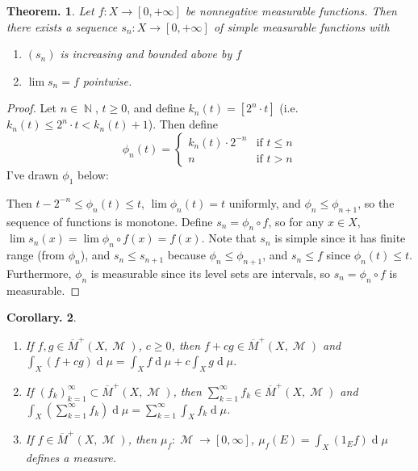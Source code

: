 \documentclass[11pt, a4paper]{memoir}
\DeclareMathOperator{\N}{{\mathbb{N}}}
\newcommand{\ol}[1]{\ensuremath{\overline{#1}}}
\theoremstyle{change}
\newtheorem{theorem}{Theorem.}[section]
\newtheorem{corollary}[theorem]{Corollary.}
\theoremstyle{plain}
\theoremstyle{nonumberplain}
\newtheorem{proof}{Proof}
\DeclareMathOperator{\M}{{\mathcal{M}}}
\renewcommand{\d}[1]{\ensuremath{\operatorname{d}\!{#1}}}
\numberwithin{equation}{section}
\begin{document}
\begin{theorem}
    Let $f:X\to[0,+\infty]$ be nonnegative measurable functions.
    Then there exists a sequence $s_n:X\to[0,+\infty]$ of simple measurable functions with
    \begin{enumerate}[nolistsep]
        \item $(s_n)$ is increasing and bounded above by $f$
        \item $\lim s_n=f$ pointwise.
    \end{enumerate}
\end{theorem}
\begin{proof}
    Let $n\in\N$, $t\geq0$, and define $k_n(t)=[2^{n}\cdot t]$ (i.e. $k_n(t)\leq 2^{n}\cdot t<k_n(t)+1$).
    Then define
    \[\phi_n(t)=\begin{cases}k_n(t)\cdot 2^{-n}&\text{if }t\leq n\\n&\text{if }t>n\end{cases}\]
    I've drawn $\phi_1$ below:
    \begin{center}
    \end{center}
    Then $t-2^{-n}\leq\phi_n(t)\leq t$, $\lim\phi_n(t)=t$ uniformly, and $\phi_n\leq \phi_{n+1}$, so the sequence of functions is monotone.
    Define $s_n=\phi_n\circ f$, so for any $x\in X$, $\lim s_n(x)=\lim \phi_n\circ f(x)=f(x)$.
    Note that $s_n$ is simple since it has finite range (from $\phi_n$), and $s_n\leq s_{n+1}$ because $\phi_n\leq \phi_{n+1}$, and $s_n\leq f$ since $\phi_n(t)\leq t$.
    Furthermore, $\phi_n$ is measurable since its level sets are intervals, so $s_n=\phi_n\circ f$ is measurable.
\end{proof}
\begin{corollary}
    \begin{enumerate}
        \item If $f,g\in\ol{M}^+(X,\M)$, $c\geq 0$, then $f+cg\in\ol{M}^+(X,\M)$ and $\int_X(f+cg)\d{\mu}=\int_X f\d{\mu}+c\int_Xg\d{\mu}$.
        \item If $(f_k)_{k=1}^\infty\subset\ol{M}^+(X,\M)$, then $\sum_{k=1}^\infty f_k\in\ol{M}^+(X,\M)$ and $\int_X\left(\sum_{k=1}^\infty f_k\right)\d{\mu}=\sum_{k=1}^\infty\int_X f_k\d{\mu}$.
        \item If $f\in\ol{M}^+(X,\M)$, then $\mu_f:\M\to[0,\infty]$, $\mu_f(E)=\int_X(1_Ef)\d{\mu}$ defines a measure.
    \end{enumerate}
\end{corollary}
\end{document}

